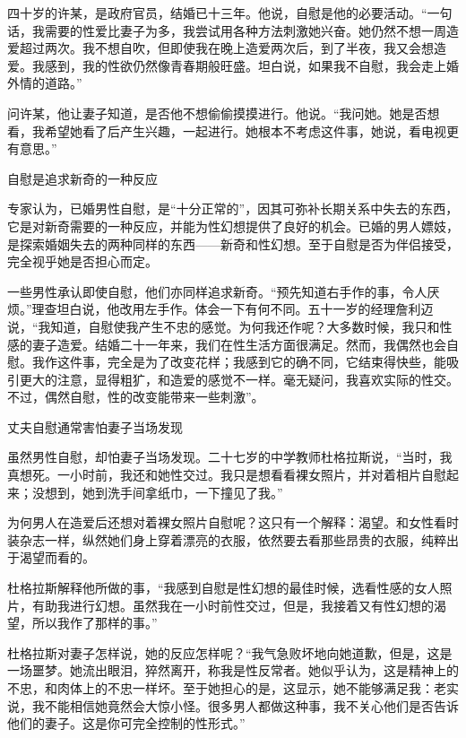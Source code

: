 \documentclass[12pt,UTF8,openany]{ctexbook}
\begin{document}
四十岁的许某，是政府官员，结婚已十三年。他说，自慰是他的必要活动。“一句话，我需要的性爱比妻子为多，我尝试用各种方法刺激她兴奋。她仍然不想一周造爱超过两次。我不想自吹，但即使我在晚上造爱两次后，到了半夜，我又会想造爱。我感到，我的性欲仍然像青春期般旺盛。坦白说，如果我不自慰，我会走上婚外情的道路。”

问许某，他让妻子知道，是否他不想偷偷摸摸进行。他说。“我问她。她是否想看，我希望她看了后产生兴趣，一起进行。她根本不考虑这件事，她说，看电视更有意思。”





自慰是追求新奇的一种反应


专家认为，已婚男性自慰，是“十分正常的”，因其可弥补长期关系中失去的东西，它是对新奇需要的一种反应，并能为性幻想提供了良好的机会。已婚的男人嫖妓，是探索婚姻失去的两种同样的东西——新奇和性幻想。至于自慰是否为伴侣接受，完全视乎她是否担心而定。

一些男性承认即使自慰，他们亦同样追求新奇。“预先知道右手作的事，令人厌烦。”理查坦白说，他改用左手作。体会一下有何不同。五十一岁的经理詹利迈说，“我知道，自慰使我产生不忠的感觉。为何我还作呢？大多数时候，我只和性感的妻子造爱。结婚二十一年来，我们在性生活方面很满足。然而，我偶然也会自慰。我作这件事，完全是为了改变花样；我感到它的确不同，它结束得快些，能吸引更大的注意，显得粗犷，和造爱的感觉不一样。毫无疑问，我喜欢实际的性交。不过，偶然自慰，性的改变能带来一些刺激”。





丈夫自慰通常害怕妻子当场发现


虽然男性自慰，却怕妻子当场发现。二十七岁的中学教师杜格拉斯说，“当时，我真想死。一小时前，我还和她性交过。我只是想看看裸女照片，并对着相片自慰起来；没想到，她到洗手间拿纸巾，一下撞见了我。”

为何男人在造爱后还想对着裸女照片自慰呢？这只有一个解释：渴望。和女性看时装杂志一样，纵然她们身上穿着漂亮的衣服，依然要去看那些昂贵的衣服，纯粹出于渴望而看的。

杜格拉斯解释他所做的事，“我感到自慰是性幻想的最佳时候，选看性感的女人照片，有助我进行幻想。虽然我在一小时前性交过，但是，我接着又有性幻想的渴望，所以我作了那样的事。”

杜格拉斯对妻子怎样说，她的反应怎样呢？“我气急败坏地向她道歉，但是，这是一场噩梦。她流出眼泪，猝然离开，称我是性反常者。她似乎认为，这是精神上的不忠，和肉体上的不忠一样坏。至于她担心的是，这显示，她不能够满足我：老实说，我不能相信她竟然会大惊小怪。很多男人都做这种事，我不关心他们是否告诉他们的妻子。这是你可完全控制的性形式。”
\end{document}
